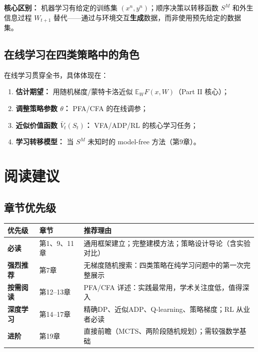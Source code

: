 \documentclass[11pt, a4paper]{article}
\begin{document}
\noindent\textbf{核心区别：} 机器学习有给定的训练集 $(x^n, y^n)$；顺序决策以转移函数 $S^M$ 和外生信息过程 $W_{t+1}$ 替代——通过与环境交互\textbf{生成}数据，而非使用预先给定的数据集。

\subsection{在线学习在四类策略中的角色}

在线学习贯穿全书，具体体现在：
\begin{enumerate}[leftmargin=2em, label=\textbf{(\arabic*)}, itemsep=2pt]
  \item \textbf{估计期望：} 用随机梯度/蒙特卡洛近似 $\mathbb{E}_W F(x, W)$（Part II 核心）；
  \item \textbf{调整策略参数 $\theta$：} PFA/CFA 的在线调参；
  \item \textbf{近似价值函数 $\bar{V}_t(S_t)$：} VFA/ADP/RL 的核心学习任务；
  \item \textbf{学习转移模型：} 当 $S^M$ 未知时的 model-free 方法（第9章）。
\end{enumerate}

\section{阅读建议}

\subsection{章节优先级}

\begin{center}
\begin{tabular}{p{2cm}p{3.5cm}p{8cm}}
\toprule
\textbf{优先级} & \textbf{章节} & \textbf{推荐理由} \\
\midrule
\textbf{必读} & 第1、9、11章 & 通用框架建立；完整建模方法；策略设计导论（含实验对比） \\
\addlinespace
\textbf{强烈推荐} & 第7章 & 无梯度随机搜索：四类策略在纯学习问题中的第一次完整展示 \\
\addlinespace
\textbf{按需阅读} & 第12--13章 & PFA/CFA 详述：实践最常用，学术关注度低，值得深入 \\
\addlinespace
\textbf{深度学习} & 第14--17章 & 精确DP、近似ADP、Q-learning、策略梯度；RL 从业者必读 \\
\addlinespace
\textbf{进阶} & 第19章 & 直接前瞻（MCTS、两阶段随机规划）；需较强数学基础 \\
\bottomrule
\end{tabular}
\end{center}
\end{document}
